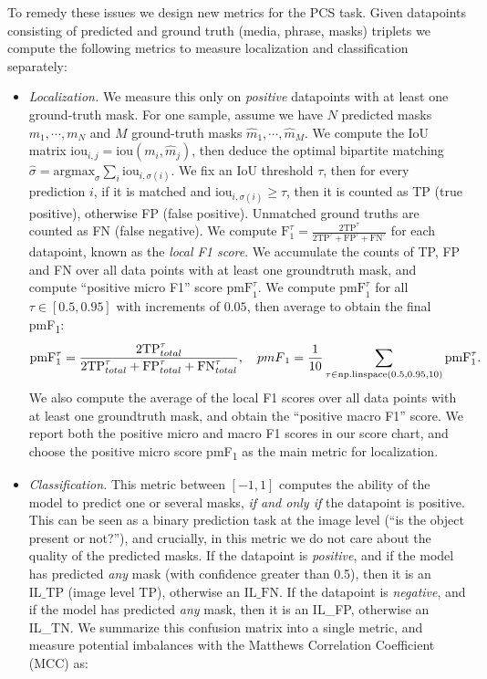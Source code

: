 \documentclass[]{fairmeta}
\newcommand{\task}{PCS\xspace}
\newcommand{\pmf}{pmF\textsubscript{1}\xspace}
\begin{document}
To remedy these issues we design new metrics for the \task task. Given datapoints consisting of predicted and ground truth (media, phrase, masks) triplets we compute the following metrics to measure localization and classification separately:
\begin{itemize}
\item \textit{Localization.} We measure this only on \emph{positive} datapoints with at least one ground-truth mask. For one sample, assume we have $N$ predicted masks $m_1,\cdots,m_N$ and $M$ ground-truth masks $\hat{m}_1,\cdots,\hat{m}_M$. We compute the IoU matrix $\mathrm{iou}_{i,j}= \mathrm{iou}(m_i,\hat{m}_j)$, then deduce the optimal bipartite matching $\hat{\sigma} = \mathrm{argmax}_\sigma \sum_i \mathrm{iou}_{i, \sigma(i)}$. We fix an IoU threshold $\tau$, then for every prediction $i$, if it is matched and $\mathrm{iou}_{i, \sigma(i)} \geq \tau$, then it is counted as TP (true positive), otherwise FP (false positive).
Unmatched ground truths are counted as FN (false negative). 
We compute $\mathrm{F}_1^\tau = \frac{2\mathrm{TP}^\tau}{2\mathrm{TP}^\tau + \mathrm{FP}^\tau + \mathrm{FN}^\tau}$ for each datapoint, known as the \textit{local F1 score}. We accumulate the counts of TP, FP and FN over all data points with at least one groundtruth mask, and compute ``positive micro F1'' score $\mathrm{pmF}_1^\tau$. We compute $\mathrm{pmF}_1^\tau$ for all $\tau \in [0.5, 0.95]$ with increments of $0.05$, then average to obtain the final \pmf:
\begin{equation}\label{eqn:pmf}
\mathrm{pmF}_1^\tau = \frac{2\mathrm{TP}^\tau_{total}}{2\mathrm{TP}^\tau_{total} + \mathrm{FP}^\tau_{total} + \mathrm{FN}^\tau_{total}}, \quad \pmf = \frac{1}{10}\sum_{\tau \in \textrm{np.linspace}(0.5, 0.95, 10)} \mathrm{pmF}_1^\tau.
\end{equation}
We also compute the average of the local F1 scores over all data points with at least one groundtruth mask, and obtain the ``positive macro F1'' score. We report both the positive micro and macro F1 scores in our score chart, and choose the positive micro score \pmf as the main metric for localization. 
\item \textit{Classification.} This metric between $[-1,1]$ computes the ability of the model to predict one or several masks, \emph{if and only if} the datapoint is positive. This can be seen as a binary prediction task at the image level (``is the object present or not?''), and crucially, in this metric we do not care about the quality of the predicted masks. 
If the datapoint is \emph{positive}, and if the model has predicted \emph{any} mask (with confidence greater than 0.5), then it is an $\mathrm{IL\_TP}$ (image level TP), otherwise an $\mathrm{IL\_FN}$. If the datapoint is \emph{negative}, and if the model has predicted \emph{any} mask, then it is an IL\_FP, otherwise an IL\_TN. We summarize this confusion matrix into a single metric, and measure potential imbalances with the Matthews Correlation Coefficient (MCC) as: 

\end{itemize}
\end{document}

